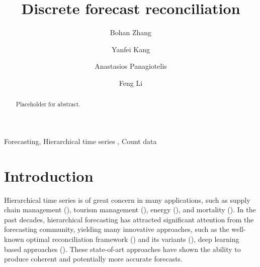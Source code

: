 \documentclass[a4paper,review,12pt,authoryear]{elsarticle}
\begin{document}
\begin{frontmatter}

  \title{Discrete forecast reconciliation}

  \author[label1]{Bohan Zhang}
  \address[label1]{School of Economics and Management, Beihang University, Beijing, China}
  
  \author[label1]{Yanfei Kang}
  \author[label2]{Anastasios Panagiotelis}
  
  \author[label3]{Feng Li}

  \address[label2]{The University of Sydney Business School, NSW 2006, Australia}
  \address[label3]{School of Statistics and Mathematics, Central University of Finance and Economics, Beijing, China}

  \begin{abstract}
    Placeholder for abstract.
  \end{abstract}

  \begin{keyword}
  Forecasting\sep
  Hierarchical time series \sep
  Count data
  \end{keyword}
  
\end{frontmatter}

\newpage

\section{Introduction}

Hierarchical time series is of great concern in many applications, such as supply chain management (\citealp{babaiDemandForecastingSupply2022}), tourism management (\citealp{kourentzesCrosstemporalCoherentForecasts2019}), energy (\citealp{nystrupTemporalHierarchiesAutocorrelation2020}), and mortality (\citealp{liHierarchicalMortalityForecasting2022}).
In the past decades, hierarchical forecasting has attracted significant attention from the forecasting community, yielding many innovative approaches, such as the well-known optimal reconciliation framework (\citealp{hyndmanOptimalCombinationForecasts2011, wickramasuriyaOptimalForecastReconciliation2019, panagiotelisProbabilisticForecastReconciliation2022}) and its variants (), deep learning based approaches (\citealp{rangapuramEndtoEndLearningCoherent2021}).
These state-of-art approaches have shown the ability to produce coherent and potentially more accurate forecasts.
\end{document}
